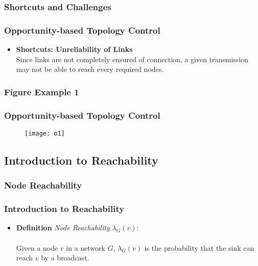 \documentclass[xcolor=dvipsnames]{beamer}
\begin{document}
\subsubsection{Shortcuts and Challenges}
\begin{frame}
\frametitle{Opportunity-based Topology Control}
\begin{itemize}
\item \textbf{Shortcuts: Unreliability of Links}\\
Since links are not completely ensured of connection, a given transmission may not be able to reach every required nodes.\\
\end{itemize}
\end{frame}

\subsubsection{Figure Example 1}
\begin{frame}
\frametitle{Opportunity-based Topology Control}
\begin{figure}
\begin{center}
  \texttt{[image: o1]}
\end{center}
\end{figure}
\end{frame}

\subsection{Introduction to Reachability}
\subsubsection{Node Reachability}
\begin{frame}
\frametitle{Introduction to Reachability}
\begin{itemize}
\item \textbf{Definition} \textit{Node Reachability} $\lambda_{G}(v)$:\\
\indent\\
Given a node $v$ in a network $G$, $\lambda_{G}(v)$ is the probability that the sink can reach $v$ by a broadcast.
\end{itemize}
\end{frame}
\end{document}
